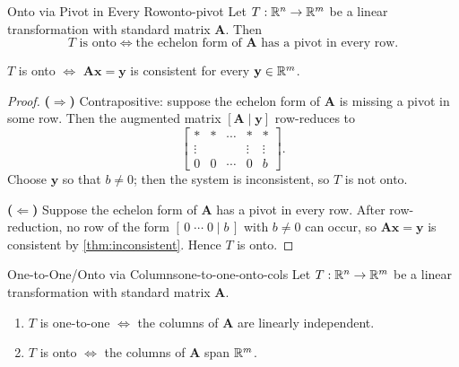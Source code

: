 \begin{theorem}{Onto via Pivot in Every Row}{onto-pivot}
  Let $T: \mathbb{R}^n \to \mathbb{R}^m$ be a linear transformation with standard matrix $\mathbf{A}$. Then
  \[
    T \text{ is onto} \iff \text{the echelon form of } \mathbf{A} \text{ has a pivot in every row}.
  \]
\end{theorem}

\begin{remark}
  $T$ is onto $\iff$ $\mathbf{A}\mathbf{x} = \mathbf{y}$ is consistent for every $\mathbf{y} \in \mathbb{R}^m$.
\end{remark}

\begin{proof}
  \textbf{($\Rightarrow$)} Contrapositive: suppose the echelon form of $\mathbf{A}$ is missing a pivot in some row. Then the augmented matrix $[\mathbf{A} \mid \mathbf{y}]$ row-reduces to
  \[
    \left[
      \begin{array}{cccc|c}
        *      & * & \cdots & *      & *      \\
        \vdots &   &        & \vdots & \vdots \\
        0      & 0 & \cdots & 0      & b
      \end{array}
      \right].
  \]
  Choose $\mathbf{y}$ so that $b \neq 0$; then the system is inconsistent, so $T$ is not onto.

  \textbf{($\Leftarrow$)} Suppose the echelon form of $\mathbf{A}$ has a pivot in every row. After row-reduction, no row of the form $[\,0\;\cdots\;0 \mid b\,]$ with $b \neq 0$ can occur, so $\mathbf{A}\mathbf{x} = \mathbf{y}$ is consistent by \ref{thm:inconsistent}. Hence $T$ is onto.
\end{proof}

\begin{theorem}{One-to-One/Onto via Columns}{one-to-one-onto-cols}
  Let $T: \mathbb{R}^n \to \mathbb{R}^m$ be a linear transformation with standard matrix $\mathbf{A}$.
  \begin{enumerate}
    \item $T$ is one-to-one $\iff$ the columns of $\mathbf{A}$ are linearly independent.
    \item $T$ is onto $\iff$ the columns of $\mathbf{A}$ span $\mathbb{R}^m$.
  \end{enumerate}
\end{theorem}
